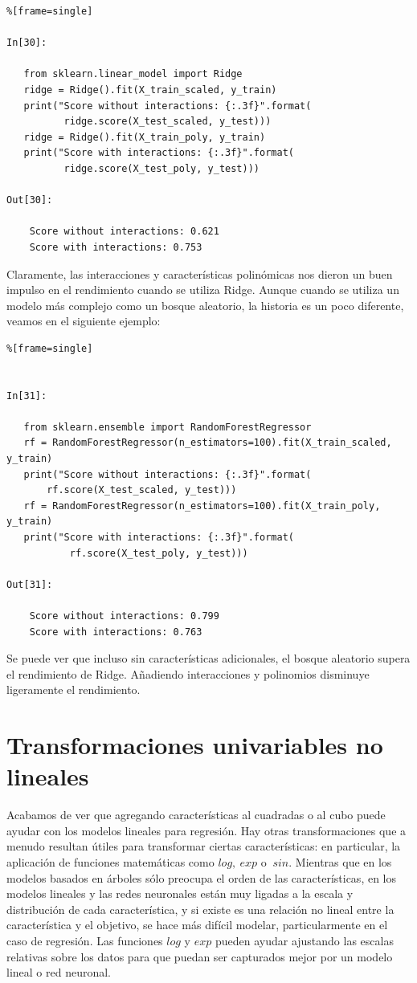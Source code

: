 \begin{lstlisting}%[frame=single]

In[30]:

   from sklearn.linear_model import Ridge
   ridge = Ridge().fit(X_train_scaled, y_train)
   print("Score without interactions: {:.3f}".format(
          ridge.score(X_test_scaled, y_test)))
   ridge = Ridge().fit(X_train_poly, y_train)
   print("Score with interactions: {:.3f}".format(
          ridge.score(X_test_poly, y_test)))

Out[30]:

    Score without interactions: 0.621
    Score with interactions: 0.753

\end{lstlisting}

Claramente, las interacciones y características polinómicas nos dieron un buen impulso en el rendimiento cuando se utiliza Ridge.  Aunque cuando se utiliza un modelo más complejo como un bosque aleatorio, la historia es un poco diferente, veamos en el siguiente ejemplo:


\begin{lstlisting}%[frame=single]


In[31]:

   from sklearn.ensemble import RandomForestRegressor
   rf = RandomForestRegressor(n_estimators=100).fit(X_train_scaled, y_train)
   print("Score without interactions: {:.3f}".format(
       rf.score(X_test_scaled, y_test)))
   rf = RandomForestRegressor(n_estimators=100).fit(X_train_poly, y_train)
   print("Score with interactions: {:.3f}".format(
           rf.score(X_test_poly, y_test)))

Out[31]:

    Score without interactions: 0.799
    Score with interactions: 0.763

\end{lstlisting}

Se puede ver que incluso sin características adicionales, el bosque aleatorio supera el rendimiento de Ridge. Añadiendo interacciones y polinomios disminuye ligeramente el rendimiento. 

\section{Transformaciones  univariables  no lineales}

Acabamos de ver que agregando características al cuadradas  o al cubo puede ayudar con 
los modelos lineales para  regresión. Hay otras transformaciones que a menudo resultan útiles para transformar ciertas características:  en particular, la aplicación de funciones matemáticas como $log,\: exp $  o $ \: sin$.  Mientras que en los modelos basados en árboles sólo  preocupa  el orden de las características, en los modelos lineales y las redes neuronales están muy ligadas a la escala y distribución de cada característica, y si existe es una relación no lineal entre la característica y el objetivo, se hace más difícil  modelar, particularmente en el caso de regresión. 
Las funciones  $log $  y  $ exp$  pueden ayudar ajustando las escalas relativas sobre los datos para que puedan ser capturados mejor por un modelo lineal o red neuronal. 
 

